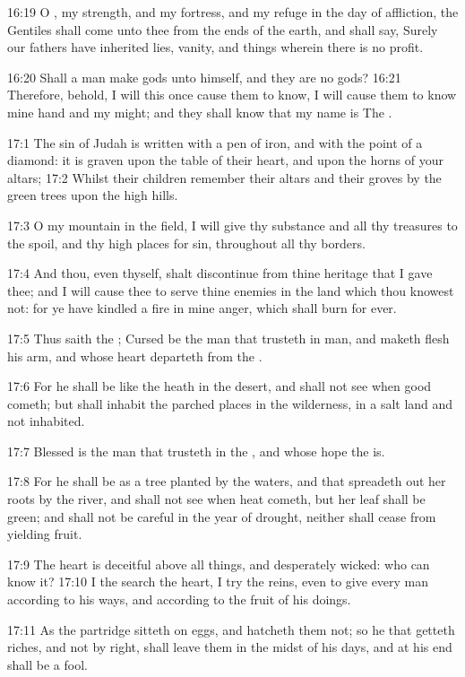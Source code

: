 16:19 O \LORD, my strength, and my fortress, and my refuge in the day of affliction, the Gentiles shall come unto thee from the ends of the earth, and shall say, Surely our fathers have inherited lies, vanity, and things wherein there is no profit.

16:20 Shall a man make gods unto himself, and they are no gods?  16:21 Therefore, behold, I will this once cause them to know, I will cause them to know mine hand and my might; and they shall know that my name is The \LORD.

17:1 The sin of Judah is written with a pen of iron, and with the point of a diamond: it is graven upon the table of their heart, and upon the horns of your altars; 17:2 Whilst their children remember their altars and their groves by the green trees upon the high hills.

17:3 O my mountain in the field, I will give thy substance and all thy treasures to the spoil, and thy high places for sin, throughout all thy borders.

17:4 And thou, even thyself, shalt discontinue from thine heritage that I gave thee; and I will cause thee to serve thine enemies in the land which thou knowest not: for ye have kindled a fire in mine anger, which shall burn for ever.

17:5 Thus saith the \LORD; Cursed be the man that trusteth in man, and maketh flesh his arm, and whose heart departeth from the \LORD.

17:6 For he shall be like the heath in the desert, and shall not see when good cometh; but shall inhabit the parched places in the wilderness, in a salt land and not inhabited.

17:7 Blessed is the man that trusteth in the \LORD, and whose hope the \LORD is.

17:8 For he shall be as a tree planted by the waters, and that spreadeth out her roots by the river, and shall not see when heat cometh, but her leaf shall be green; and shall not be careful in the year of drought, neither shall cease from yielding fruit.

17:9 The heart is deceitful above all things, and desperately wicked: who can know it?  17:10 I the \LORD search the heart, I try the reins, even to give every man according to his ways, and according to the fruit of his doings.

17:11 As the partridge sitteth on eggs, and hatcheth them not; so he that getteth riches, and not by right, shall leave them in the midst of his days, and at his end shall be a fool.

